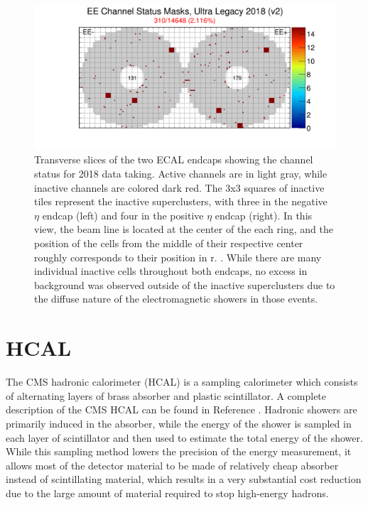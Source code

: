 \begin{figure}[htbp]
    \includegraphics[width=\textwidth]{figures/EEChannelMasks.png}
    \centering
	\caption[Masked ECAL cells]{Transverse slices of the two ECAL endcaps showing the channel status for 2018 data taking. Active channels are in light gray, while inactive channels are colored dark red. The 3x3 squares of inactive tiles represent the inactive superclusters, with three in the negative $\eta$ endcap (left) and four in the positive $\eta$ endcap (right). In this view, the beam line is located at the center of the each ring, and the position of the cells from the middle of their respective center roughly corresponds to their position in r. \cite{EcalDPG}. While there are many individual inactive cells throughout both endcaps, no excess in background was observed outside of the inactive superclusters due to the diffuse nature of the electromagnetic showers in those events.}
    \label{fig:EEmasks}
\end{figure}

\section{HCAL}
The CMS hadronic calorimeter (HCAL) is a sampling calorimeter which consists of alternating layers of brass absorber and plastic scintillator. 
A complete description of the CMS HCAL can be found in Reference \cite{HCALtdr}.
Hadronic showers are primarily induced in the absorber, while the energy of the shower is sampled in each layer of scintillator and then used to estimate the total energy of the shower. 
While this sampling method lowers the precision of the energy measurement, it allows most of the detector material to be made of relatively cheap absorber instead of scintillating material, which results in a very substantial cost reduction due to the large amount of material required to stop high-energy hadrons.

